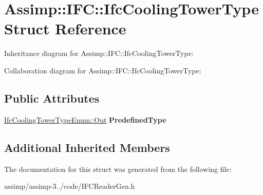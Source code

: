 \hypertarget{struct_assimp_1_1_i_f_c_1_1_ifc_cooling_tower_type}{\section{Assimp\+:\+:I\+F\+C\+:\+:Ifc\+Cooling\+Tower\+Type Struct Reference}
\label{struct_assimp_1_1_i_f_c_1_1_ifc_cooling_tower_type}
}


Inheritance diagram for Assimp\+:\+:I\+F\+C\+:\+:Ifc\+Cooling\+Tower\+Type\+:


Collaboration diagram for Assimp\+:\+:I\+F\+C\+:\+:Ifc\+Cooling\+Tower\+Type\+:
\subsection*{Public Attributes}
\begin{DoxyCompactItemize}
\item 
\hypertarget{struct_assimp_1_1_i_f_c_1_1_ifc_cooling_tower_type_a295b56c2e0a851f491eb1eb2110f8112}{\hyperlink{classboost_1_1shared__ptr}{Ifc\+Cooling\+Tower\+Type\+Enum\+::\+Out} {\bfseries Predefined\+Type}}\label{struct_assimp_1_1_i_f_c_1_1_ifc_cooling_tower_type_a295b56c2e0a851f491eb1eb2110f8112}

\end{DoxyCompactItemize}
\subsection*{Additional Inherited Members}


The documentation for this struct was generated from the following file\+:\begin{DoxyCompactItemize}
\item 
assimp/assimp-\/3../code/I\+F\+C\+Reader\+Gen.\+h\end{DoxyCompactItemize}
